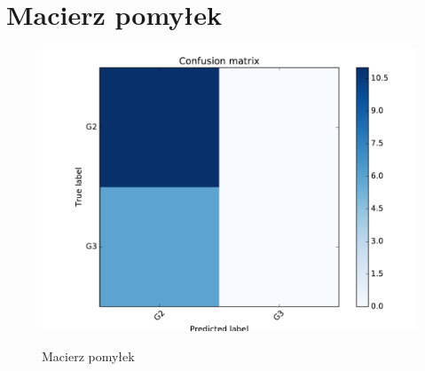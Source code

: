 \section{Macierz pomyłek}

\begin{figure}[h!]
	\centering
	\includegraphics[width=\linewidth]{img/conf_matrix.pdf}
	\label{Rysunek}
	\caption{Macierz pomyłek}
\end{figure}
